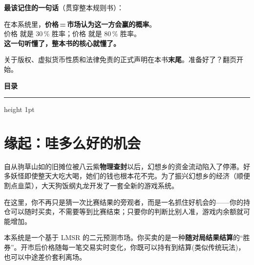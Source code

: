 \documentclass[11pt,a4paper,twoside]{article}
\begin{document}
\vspace{0.4em}

\textbf{最该记住的一句话}（贯穿整本规则书）：

\begin{notebox}
\centering 在本系统里，\textbf{价格\,=\,市场认为这一方会赢的概率}。\\[0.2em]
价格  就是 30\,\% 胜率；价格  就是 80\,\% 胜率。\\[0.2em]
\textbf{这一句听懂了，整本书的核心就懂了。}
\end{notebox}

\vspace{0.3em}
\textcolor{soft}{\small 关于版权、虚拟货币性质和法律免责的正式声明在本书\textbf{末尾}。准备好了？翻页开始。}

\clearpage

\thispagestyle{empty}
\vspace*{0.5cm}
{\sffamily\bfseries\Large 目\quad 录}\par
\vspace{0.4em}
{\color{rule}\hrule height 1pt}
\vspace{0.6em}
\begingroup
  \renewcommand{\contentsname}{}
  \tableofcontents
\endgroup
\clearpage

\section{缘起：哇多么好的机会}


自从驹草山如的旧摊位被八云紫\textbf{物理查封}以后，幻想乡的资金流动陷入了停滞。好多妖怪即使整天大吃大喝，她们的钱也根本花不完。为了振兴幻想乡的经济（顺便割点韭菜），大天狗饭纲丸龙开发了一套全新的游戏系统。

在这里，你不再只是\textcolor{soft}{猜一次比赛结果}的旁观者，而是一名抓住好机会的——你的持仓可以随时买卖，不需要等到比赛结束；只要你的判断比别人准，游戏内余额就可能增加。

\begin{notebox}
本系统是一个基于 LMSR 的二元预测市场。你买卖的是一种\textbf{随对局结果结算}的“胜券”。开市后价格随每一笔交易实时变化，你既可以持有到结算(类似传统玩法)，也可以中途差价套利离场。
\end{notebox}
\end{document}
